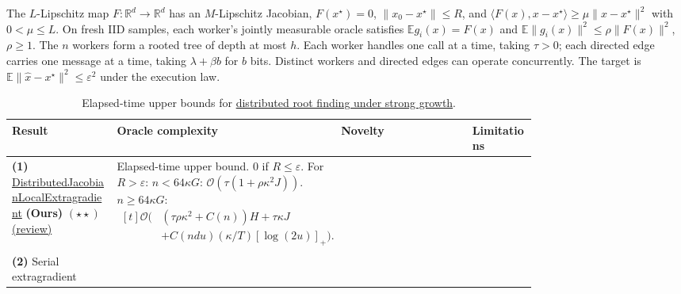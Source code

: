 \begin{table}[tp]
\centering
\caption{Elapsed-time upper bounds for \href{https://github.com/k3nfalt/longtails/blob/main/LongTails/Setups/DistributedJacobianStrongGrowth.lean}{distributed root finding under strong growth}.}\label{tab:DistributedJacobianStrongGrowth}
\parbox{\linewidth}{\footnotesize The $L$-Lipschitz map $F:\mathbb R^d\to\mathbb R^d$ has an $M$-Lipschitz Jacobian, $F(x^\star)=0$, $\|x_0-x^\star\|\le R$, and $\langle F(x),x-x^\star\rangle\ge\mu\|x-x^\star\|^2$ with $0<\mu\le L$. On fresh IID samples, each worker's jointly measurable oracle satisfies $\mathbb E g_i(x)=F(x)$ and $\mathbb E\|g_i(x)\|^2\le\rho\|F(x)\|^2$, $\rho\ge1$. The $n$ workers form a rooted tree of depth at most $h$. Each worker handles one call at a time, taking $\tau>0$; each directed edge carries one message at a time, taking $\lambda+\beta b$ for $b$ bits. Distinct workers and directed edges can operate concurrently. The target is $\mathbb E\|\hat x-x^\star\|^2\le\varepsilon^2$ under the execution law.}\par\smallskip
\begin{threeparttable}
\footnotesize
\setlength{\tabcolsep}{4pt}\renewcommand{\arraystretch}{1.25}
\begin{tabularx}{\linewidth}{@{}>{\raggedright\arraybackslash}p{0.20\linewidth}>{\raggedright\arraybackslash}p{0.32\linewidth}>{\raggedright\arraybackslash}p{0.25\linewidth}>{\raggedright\arraybackslash}X@{}}
\toprule
\textbf{Result} & \textbf{Oracle complexity} & \textbf{Novelty} & \textbf{Limitations} \\
\midrule
\textbf{(1)} \href{https://github.com/k3nfalt/longtails/blob/main/LongTails/Theorems/DistributedJacobianLocalExtragradient.lean}{Distributed\allowbreak Jacobian\allowbreak Local\allowbreak Extragradient} \textbf{(Ours)} $(\star\star)$ \href{https://github.com/k3nfalt/longtails/blob/main/scripts/reviews/DistributedJacobianLocalExtragradient.md}{(review)}
& Elapsed-time upper bound. $0$ if $R\le\varepsilon$. For $R>\varepsilon$:\newline
$n<64\kappa G$: $\mathcal{O}(\tau(1+\rho\kappa^2 J))$.\newline
$n\ge64\kappa G$:
$\begin{aligned}[t]
\mathcal{O}\big(&(\tau\rho\kappa^2+C(n))H+\tau\kappa J\\
 &+C(ndu)(\kappa/T)[\log(2u)]_+\big).
\end{aligned}$ & & \\
\midrule[1.2pt]
\textbf{(2)} Serial extragradient \citep[Prop.~F.4]{djNovoselov2026v1}

\end{tabularx}
\end{threeparttable}
\end{table}
